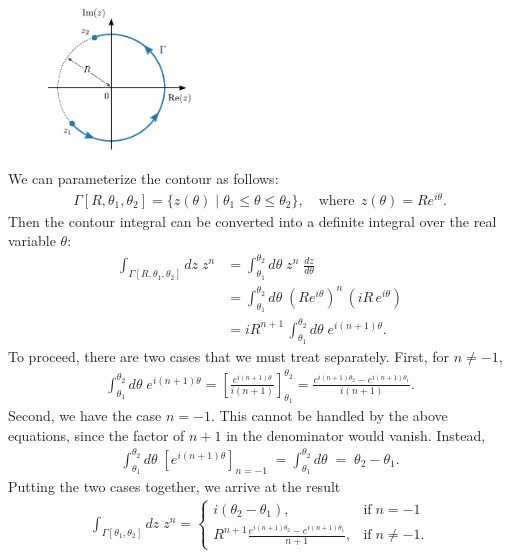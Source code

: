 \documentclass[10pt,a4paper]{article}
\begin{document}
\begin{figure}[H]
  \centering\includegraphics[width=0.34\textwidth]{complex_integral_example}
\end{figure}

\noindent
We can parameterize the contour as follows:
\begin{align}
  \Gamma[R, \theta_1,\theta_2] = \big\{z(\theta) \;\big|\; \theta_1 \le \theta \le \theta_2\big\}, \quad \mathrm{where}\;\, z(\theta) = R e^{i\theta}.
\end{align}
Then the contour integral can be converted into a definite integral
over the real variable $\theta$:
\begin{align}
  \int_{\Gamma[R, \theta_1,\theta_2]} dz\; z^n &= \int_{\theta_1}^{\theta_2}  d\theta \; z^n \; \frac{dz}{d\theta} \\
  &= \int_{\theta_1}^{\theta_2}  d\theta \; \left( Re^{i\theta}\right)^n\, \left(iR\, e^{i\theta}\right) \\
  &= i R^{n+1} \, \int_{\theta_1}^{\theta_2}  d\theta \; e^{i(n+1)\theta}.
\end{align}
To proceed, there are two cases that we must treat separately.  First,
for $n \ne -1$,
\begin{align}
  \int_{\theta_1}^{\theta_2} d\theta \; e^{i(n+1)\theta} = \left[\frac{e^{i(n+1)\theta}}{i(n+1)}\right]_{\theta_1}^{\theta_2} = \frac{e^{i(n+1)\theta_2} - e^{i(n+1)\theta_1}}{i(n+1)}.
\end{align}
Second, we have the case $n = -1$. This cannot be handled by the above
equations, since the factor of $n + 1$ in the denominator would
vanish.  Instead,
\begin{align}
  \int_{\theta_1}^{\theta_2} d\theta \; \left[e^{i(n+1)\theta} \right]_{n=-1} \; = \int_{\theta_1}^{\theta_2} d\theta \;=\; \theta_2 - \theta_1.
\end{align}
Putting the two cases together, we arrive at the result
\begin{align}
  \int_{\Gamma[\theta_1,\theta_2]} dz\; z^n = \left\{\begin{array}{ll}i(\theta_2 - \theta_1), & \mathrm{if}\;n = -1 \\ \displaystyle R^{n+1}\frac{e^{i(n+1)\theta_2} - e^{i(n+1)\theta_1}}{n+1},&\mathrm{if}\;n\ne -1.\end{array}\right.
\end{align}
\end{document}
